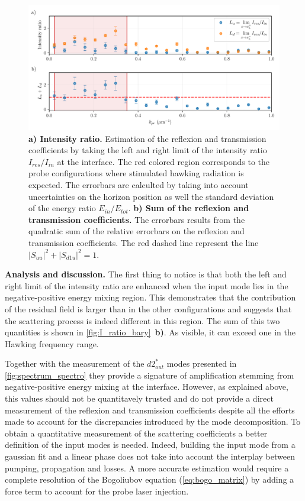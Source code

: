 \begin{figure}
    \centering
    \includegraphics[width=1\textwidth]{chap_stimulated_hawking/fig/I_ratio_bary.pdf}
    \caption{\textbf{a) Intensity ratio.} Estimation of the reflexion and transmission coefficients by taking the left and right limit of the intensity ratio $I_{res}/I_{in}$ at the interface. 
    The red colored region corresponds to the probe configurations where stimulated hawking radiation is expected. The errorbars are calculted by taking into account uncertainties on the horizon position as well the standard deviation of the energy ratio $E_{in}/E_{tot}$.
    \textbf{b) Sum of the reflexion and transmission coefficients.} The errorbars results from the quadratic sum of the relative errorbars on the reflexion and transmission coefficients. The red dashed line represent the line $|S_{uu}|^2+|S_{d1u}|^2=1$.}
    \label{fig:I_ratio_bary}
\end{figure}


\textbf{Analysis and discussion.} The first thing to notice is that both the left and right limit of the intensity ratio are enhanced when the input mode lies in the negative-positive energy mixing region. This demonstrates
 that the contribution of the residual field is larger than in the other configurations and suggests
that the scattering process is indeed different in this region. The sum of this two quantities is shown in \autoref{fig:I_ratio_bary}~\textbf{b)}. As visible,
it can exceed one in the Hawking frequency range.

Together with the measurement of the $d2^*_{out}$ modes presented in \autoref{fig:spectrum_spectro} they provide a signature of amplification stemming from 
negative-positive energy mixing at the interface. However, as explained above, this values should not be quantitavely trusted and do not provide a 
direct measurement of the reflexion and transmission coefficients despite all the efforts made to account for the discrepancies introduced by the mode decomposition.
To obtain a quantitative measurement of the scattering coefficients a better definition of the input modes is needed. Indeed, building the input mode from a gaussian fit and a linear phase does not take into account the interplay
between pumping, propagation and losses. A more accurate estimation would require a complete resolution of the Bogoliubov equation (\ref{eq:bogo_matrix}) by adding a force term 
to account for the probe laser injection. 

